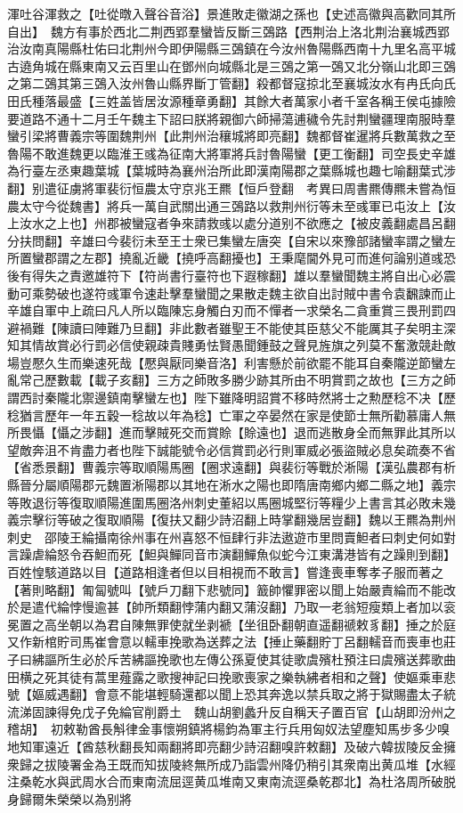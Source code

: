 渾吐谷渾救之【吐從暾入聲谷音浴】景進敗走徽湖之孫也【史述高徽與高歡同其所自出】　魏方有事於西北二荆西郢羣蠻皆反斷三鵶路【西荆治上洛北荆治襄城西郢治汝南真陽縣杜佑曰北荆州今即伊陽縣三鵶鎮在今汝州魯陽縣西南十九里名高平城古遶角城在縣東南又云百里山在鄧州向城縣北是三鵶之第一鵶又北分嶺山北即三鵶之第二鵶其第三鵶入汝州魯山縣界斷丁管翻】殺都督寇掠北至襄城汝水有冉氏向氏田氏種落最盛【三姓盖皆居汝源種章勇翻】其餘大者萬家小者千室各稱王侯屯據險要道路不通十二月壬午魏主下詔曰朕將親御六師掃蕩逋穢令先討荆蠻疆理南服時羣蠻引梁將曹義宗等圍魏荆州【此荆州治穰城將即亮翻】魏都督崔暹將兵數萬救之至魯陽不敢進魏更以臨淮王彧為征南大將軍將兵討魯陽蠻【更工衡翻】司空長史辛雄為行臺左丞東趣葉城【葉城時為襄州治所此即漢南陽郡之葉縣城也趣七喻翻葉式涉翻】别遣征虜將軍裴衍恒農太守京兆王羆【恒戶登翻　考異曰周書羆傳羆未嘗為恒農太守今從魏書】將兵一萬自武關出通三鵶路以救荆州衍等未至彧軍已屯汝上【汝上汝水之上也】州郡被蠻寇者争來請救彧以處分道别不欲應之【被皮義翻處昌呂翻分扶問翻】辛雄曰今裴衍未至王士衆已集蠻左唐突【自宋以來豫部諸蠻率謂之蠻左所置蠻郡謂之左郡】撓亂近畿【撓呼高翻擾也】王秉麾閫外見可而進何論别道彧恐後有得失之責邀雄符下【符尚書行臺符也下遐稼翻】雄以羣蠻聞魏主將自出心必震動可乘勢破也遂符彧軍令速赴擊羣蠻聞之果散走魏主欲自出討賊中書令袁飜諫而止辛雄自軍中上疏曰凡人所以臨陳忘身觸白刃而不憚者一求榮名二貪重賞三畏刑罰四避禍難【陳讀曰陣難乃旦翻】非此數者雖聖王不能使其臣慈父不能厲其子矣明主深知其情故賞必行罰必信使親疎貴賤勇怯賢愚聞鍾鼓之聲見旌旗之列莫不奮激競赴敵場豈懕久生而樂速死哉【懕與厭同樂音洛】利害懸於前欲罷不能耳自秦隴逆節蠻左亂常己歷數載【載子亥翻】三方之師敗多勝少跡其所由不明賞罰之故也【三方之師謂西討秦隴北禦邊鎮南擊蠻左也】陛下雖降明詔賞不移時然將士之勲歷稔不决【歷稔猶言歷年一年五穀一稔故以年為稔】亡軍之卒晏然在家是使節士無所勸慕庸人無所畏懾【懾之涉翻】進而擊賊死交而賞賒【賒遠也】退而逃散身全而無罪此其所以望敵奔沮不肯盡力者也陛下誠能號令必信賞罰必行則軍威必張盜賊必息矣疏奏不省【省悉景翻】曹義宗等取順陽馬圈【圈求遠翻】與裴衍等戰於淅陽【漢弘農郡有析縣晉分屬順陽郡元魏置淅陽郡以其地在淅水之陽也即隋唐南鄉内鄉二縣之地】義宗等敗退衍等復取順陽進圍馬圈洛州刺史董紹以馬圈城堅衍等糧少上書言其必敗未幾義宗擊衍等破之復取順陽【復扶又翻少詩沼翻上時掌翻幾居豈翻】魏以王羆為荆州刺史　邵陵王綸攝南徐州事在州喜怒不恒肆行非法遨遊市里問賣䱇者曰刺史何如對言躁虐綸怒令吞䱇而死【䱇與鱓同音市演翻鱓魚似蛇今江東溝港皆有之躁則到翻】百姓惶駭道路以目【道路相逢者但以目相視而不敢言】嘗逢喪車奪孝子服而著之【著則略翻】匍匐號叫【號戶刀翻下悲號同】籖帥懼罪密以聞上始嚴責綸而不能改於是遣代綸悖慢逾甚【帥所類翻悖蒲内翻又蒲沒翻】乃取一老翁短瘦類上者加以衮冕置之高坐朝以為君自陳無罪使就坐剥褫【坐徂卧翻朝直遥翻禠敕豸翻】捶之於庭又作新棺貯司馬崔會意以轜車挽歌為送葬之法【捶止藥翻貯丁呂翻轜音而喪車也莊子曰紼謳所生必於斥苦紼謳挽歌也左傳公孫夏使其徒歌虞殯杜預注曰虞殯送葬歌曲田横之死其徒有蒿里薤露之歌搜神記曰挽歌喪家之樂執紼者相和之聲】使嫗乘車悲號【嫗威遇翻】會意不能堪輕騎還都以聞上恐其奔逸以禁兵取之將于獄賜盡太子統流涕固諫得免戊子免綸官削爵土　魏山胡劉蠡升反自稱天子置百官【山胡即汾州之稽胡】　初敕勒酋長斛律金事懷朔鎮將楊鈞為軍主行兵用匈奴法望塵知馬步多少嗅地知軍遠近【酋慈秋翻長知兩翻將即亮翻少詩沼翻嗅許敕翻】及破六韓拔陵反金擁衆歸之拔陵署金為王既而知拔陵終無所成乃詣雲州降仍稍引其衆南出黄瓜堆【水經注桑乾水與武周水合而東南流屈逕黄瓜堆南又東南流逕桑乾郡北】為杜洛周所破脱身歸爾朱榮榮以為别將

